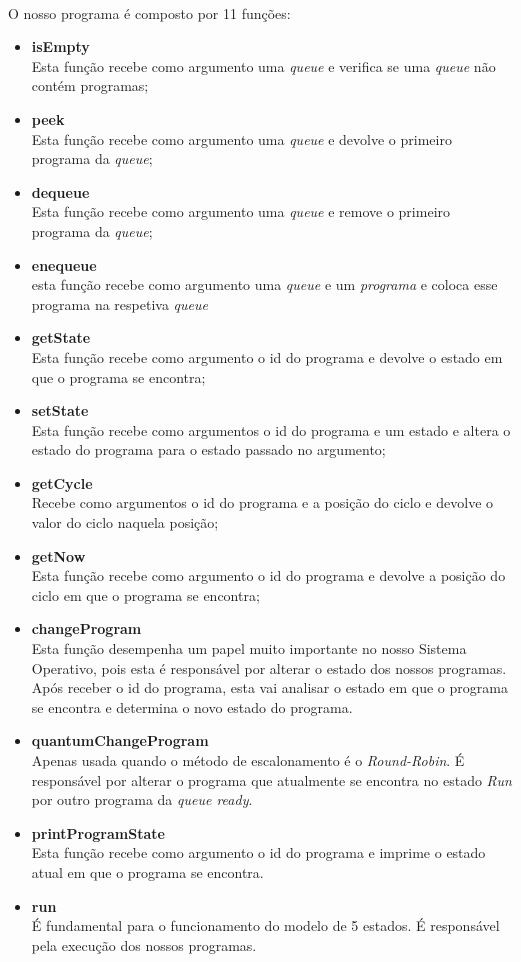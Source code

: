 \documentclass{article}
\begin{document}
\paragraph{}
O nosso programa é composto por 11 funções:
\begin{itemize}
    \item \textbf{isEmpty}\\
        Esta função recebe como argumento uma \emph{queue} e  verifica se uma \emph{queue} não contém programas;
    \item \textbf{peek}\\
        Esta função recebe como argumento uma \emph{queue} e devolve o primeiro programa da \emph{queue};
    \item  \textbf{dequeue}\\
        Esta função recebe como argumento uma \emph{queue} e remove o primeiro programa da \emph{queue};
    \item \textbf{enequeue}\\
        esta função recebe como argumento uma \emph{queue} e um \emph{programa} e coloca esse programa na respetiva \emph{queue}
    \item  \textbf{getState}\\
        Esta função recebe como argumento o id do programa e devolve o estado em que o programa se encontra;
    \item \textbf{setState}\\
        Esta função recebe como argumentos o id do programa e um estado e altera o estado do programa para o estado passado no argumento;
    \item \textbf{getCycle}\\
        Recebe como argumentos o id do programa e a posição do ciclo e devolve o valor do ciclo naquela posição;
    \item \textbf{getNow}\\
        Esta função recebe como argumento o id do programa e devolve a posição do ciclo em que o programa se encontra;
    \item \textbf{changeProgram}\\
        Esta função desempenha um papel muito importante no nosso Sistema Operativo, pois esta é responsável por alterar o estado dos nossos programas. Após receber o id do programa, esta vai analisar o estado em que o programa se encontra e determina o novo estado do programa.
    \item \textbf{quantumChangeProgram}\\
        Apenas usada quando o método de escalonamento é o \emph{Round-Robin}. É responsável por alterar o programa que atualmente se encontra no estado \emph{Run} por outro programa da \emph{queue ready}.
    \item \textbf{printProgramState} \\
        Esta função recebe como argumento o id do programa e imprime o estado atual em que o programa se encontra.
    \item \textbf{run}\\
        É fundamental para o funcionamento do modelo de 5 estados. É responsável pela execução dos nossos programas.
        

\end{itemize}
\end{document}
